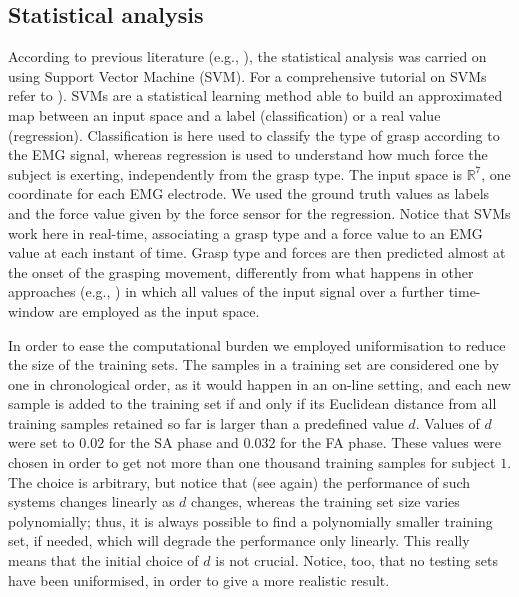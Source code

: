 \documentclass[10pt]{bmc_article}
\newenvironment{bmcformat}{\begin{raggedright}\baselineskip20pt\sloppy\setboolean{publ}{false}}{\end{raggedright}\baselineskip20pt\sloppy}
\def\RR{\mathbb{R}}
\begin{document}
\begin{bmcformat}
\subsection*{Statistical analysis}

According to previous literature (e.g., \cite{smagt,2008.BioCyb}), the
statistical analysis was carried on using Support Vector Machine (SVM).
For a comprehensive tutorial on SVMs refer to
\cite{Burges98,SmolaTut2004}). SVMs are a statistical learning method
able to build an approximated map between an input space and a label
(classification) or a real value (regression). Classification is here
used to classify the type of grasp according to the EMG signal,
whereas regression is used to understand how much force the subject is
exerting, independently from the grasp type. The input space is
$\RR^7$, one coordinate for each EMG electrode. We used the
ground truth values as labels and the force value given by the force sensor
for the regression. Notice that SVMs work here in real-time, associating a grasp type
and a force value to an EMG value at each instant of time.
Grasp type and forces are then predicted almost at the onset of the
grasping movement, differently from what happens in other approaches (e.g.,
\cite{smagt,Sebelius2005}) in which all values of the input signal over a
further time-window are employed as the input space.

In order to ease the computational burden we employed uniformisation
\cite{2008.BioCyb} to reduce the size of the training sets. The samples
in a training set are considered one by one in chronological order, as it
would happen in an on-line setting, and each new sample is added to the
training set if and only if its Euclidean distance from all training samples
retained so far is larger than a predefined value $d$. Values of $d$ were
set to $0.02$ for the SA phase and $0.032$ for the FA phase. These values
were chosen in order to get not more than one thousand training
samples for subject $1$. The choice is arbitrary, but notice that
(see \cite{2008.BioCyb} again) the performance of such
systems changes linearly as $d$ changes, whereas the training set size
varies polynomially; thus, it is always possible to find a
polynomially smaller training set, if needed, which will degrade the
performance only linearly. This really means that the initial choice
of $d$ is not crucial. Notice, too, that no testing sets have been
uniformised, in order to give a more realistic result.


\end{bmcformat}
\end{document}
